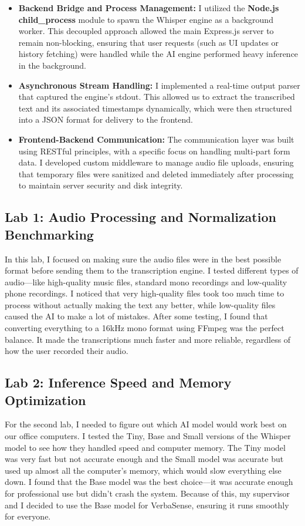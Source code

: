 \documentclass[oneside]{thesis-library}
\begin{document}
\begin{itemize}
    \item \textbf{Backend Bridge and Process Management:} I utilized the \textbf{Node.js child\_process} module to spawn the Whisper engine as a background worker. This decoupled approach allowed the main Express.js server to remain non-blocking, ensuring that user requests (such as UI updates or history fetching) were handled while the AI engine performed heavy inference in the background.
    \item \textbf{Asynchronous Stream Handling:} I implemented a real-time output parser that captured the engine's stdout. This allowed us to extract the transcribed text and its associated timestamps dynamically, which were then structured into a JSON format for delivery to the frontend.
    \item \textbf{Frontend-Backend Communication:} The communication layer was built using RESTful principles, with a specific focus on handling multi-part form data. I developed custom middleware to manage audio file uploads, ensuring that temporary files were sanitized and deleted immediately after processing to maintain server security and disk integrity.
\end{itemize}

\subsection{Lab 1: Audio Processing and Normalization Benchmarking}
In this lab, I focused on making sure the audio files were in the best possible format before sending them to the transcription engine. I tested different types of audio—like high-quality music files, standard mono recordings and low-quality phone recordings. I noticed that very high-quality files took too much time to process without actually making the text any better, while low-quality files caused the AI to make a lot of mistakes. After some testing, I found that converting everything to a 16kHz mono format using FFmpeg was the perfect balance. It made the transcriptions much faster and more reliable, regardless of how the user recorded their audio.

\subsection{Lab 2: Inference Speed and Memory Optimization}
For the second lab, I needed to figure out which AI model would work best on our office computers. I tested the Tiny, Base and Small versions of the Whisper model to see how they handled speed and computer memory. The Tiny model was very fast but not accurate enough and the Small model was accurate but used up almost all the computer's memory, which would slow everything else down. I found that the Base model was the best choice—it was accurate enough for professional use but didn't crash the system. Because of this, my supervisor and I decided to use the Base model for VerbaSense, ensuring it runs smoothly for everyone.
\end{document}
